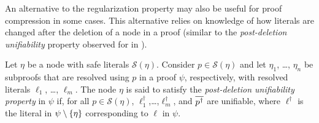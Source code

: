 An alternative to the regularization property may also be useful for proof compression in some cases. This alternative relies on knowledge of how literals are changed after the deletion of a node in a proof (similar to the \emph{post-deletion unifiability} property observed for {\FOLowerUnits} in \cite{GFOLU}).  
\begin{definition}
Let $\eta$ be a node with safe literals $\mathcal{S}(\eta)$. Consider $p\in \mathcal{S}(\eta)$ and let $\eta_1$, \ldots, $\eta_n$ be subproofs that are resolved using $p$ in a proof $\psi$, respectively, with resolved literals $\ell_1$, \ldots, $\ell_m$. 
The node $\eta$ is said to satisfy the \emph{post-deletion unifiability property} in $\psi$ if, for all $p\in \mathcal{S}(\eta)$, $\ell_1^{\dagger}$,\ldots,$\ell_m^{\dagger}$, and $\overline{p^{\dagger}}$ are unifiable, where $\ell^{\dagger}$ is the literal in $\psi \setminus \{\eta\}$ corresponding to $\ell$ in $\psi$.
\end{definition}


